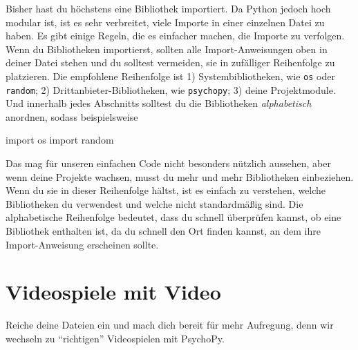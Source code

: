 \documentclass[
]{book}
\newenvironment{Shaded}{\begin{snugshade}}{\end{snugshade}}
\newcommand{\ImportTok}[1]{#1}
\newcommand{\NormalTok}[1]{#1}
\begin{document}
Bisher hast du höchstens eine Bibliothek importiert. Da Python jedoch hoch modular ist, ist es sehr verbreitet, viele Importe in einer einzelnen Datei zu haben. Es gibt einige Regeln, die es einfacher machen, die Importe zu verfolgen. Wenn du Bibliotheken importierst, sollten alle Import-Anweisungen oben in deiner Datei stehen und du solltest vermeiden, sie in zufälliger Reihenfolge zu platzieren. Die empfohlene Reihenfolge ist 1) Systembibliotheken, wie \texttt{os} oder \texttt{random}; 2) Drittanbieter-Bibliotheken, wie \texttt{psychopy}; 3) deine Projektmodule. Und innerhalb jedes Abschnitts solltest du die Bibliotheken \emph{alphabetisch} anordnen, sodass beispielsweise

\begin{Shaded}
\begin{Highlighting}[]
\ImportTok{import}\NormalTok{ os}
\ImportTok{import}\NormalTok{ random}
\end{Highlighting}
\end{Shaded}

Das mag für unseren einfachen Code nicht besonders nützlich aussehen, aber wenn deine Projekte wachsen, musst du mehr und mehr Bibliotheken einbeziehen. Wenn du sie in dieser Reihenfolge hältst, ist es einfach zu verstehen, welche Bibliotheken du verwendest und welche nicht standardmäßig sind. Die alphabetische Reihenfolge bedeutet, dass du schnell überprüfen kannst, ob eine Bibliothek enthalten ist, da du schnell den Ort finden kannst, an dem ihre Import-Anweisung erscheinen sollte.

\hypertarget{videospiele-mit-video}{%
\section{Videospiele mit Video}\label{videospiele-mit-video}}

Reiche deine Dateien ein und mach dich bereit für mehr Aufregung, denn wir wechseln zu ``richtigen'' Videospielen mit PsychoPy.

  
\end{document}
